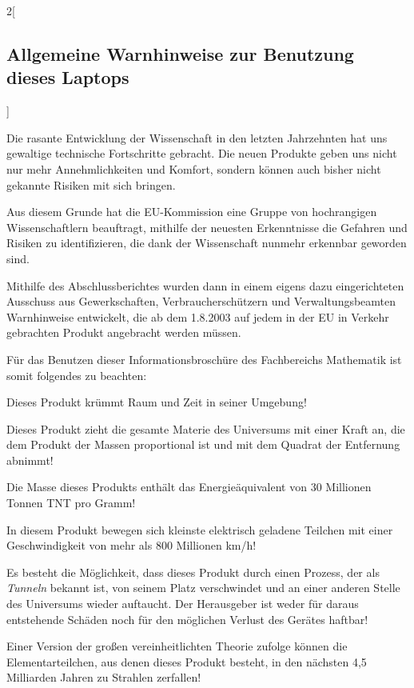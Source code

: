 \begin{multicols}{2}[\subsection{Allgemeine Warnhinweise zur Benutzung dieses
Laptops}]

Die rasante Entwicklung der Wissenschaft in den letzten Jahrzehnten hat uns
gewaltige technische Fortschritte gebracht. Die neuen Produkte geben uns nicht
nur mehr Annehmlichkeiten und Komfort, sondern können auch bisher nicht
gekannte Risiken mit sich bringen.

Aus diesem Grunde hat die EU-Kommission eine Gruppe von hochrangigen
Wissenschaftlern beauftragt, mithilfe der neuesten Erkenntnisse die Gefahren
und Risiken zu identifizieren, die dank der Wissenschaft nunmehr erkennbar
geworden sind.

Mithilfe des Abschlussberichtes wurden dann in einem eigens dazu eingerichteten
Ausschuss aus Gewerkschaften, Verbraucherschützern und Verwaltungsbeamten
Warnhinweise entwickelt, die ab dem 1.8.2003 auf jedem in der EU in Verkehr
gebrachten Produkt angebracht werden müssen.

Für das Benutzen dieser Informationsbroschüre des Fachbereichs Mathematik ist
somit folgendes zu beachten:

\important Dieses Produkt krümmt Raum und Zeit in seiner Umgebung!

\important Dieses Produkt zieht die gesamte Materie des Universums mit einer
Kraft an, die dem Produkt der Massen proportional ist und mit dem Quadrat der
Entfernung abnimmt!

\important Die Masse dieses Produkts enthält das Energieäquivalent von 30
Millionen Tonnen TNT pro Gramm!

\important In diesem Produkt bewegen sich kleinste elektrisch geladene Teilchen
mit einer Geschwindigkeit von mehr als 800 Millionen km/h!

\important Es besteht die Möglichkeit, dass dieses Produkt durch einen Prozess,
der als \emph{Tunneln} bekannt ist, von seinem Platz verschwindet und an einer
anderen Stelle des Universums wieder auftaucht. Der Herausgeber ist weder für
daraus entstehende Schäden noch für den möglichen Verlust des Gerätes haftbar!

\important Einer Version der großen vereinheitlichten Theorie zufolge können
die Elementarteilchen, aus denen dieses Produkt besteht, in den nächsten 4,5
Milliarden Jahren zu Strahlen zerfallen!


\end{multicols}
